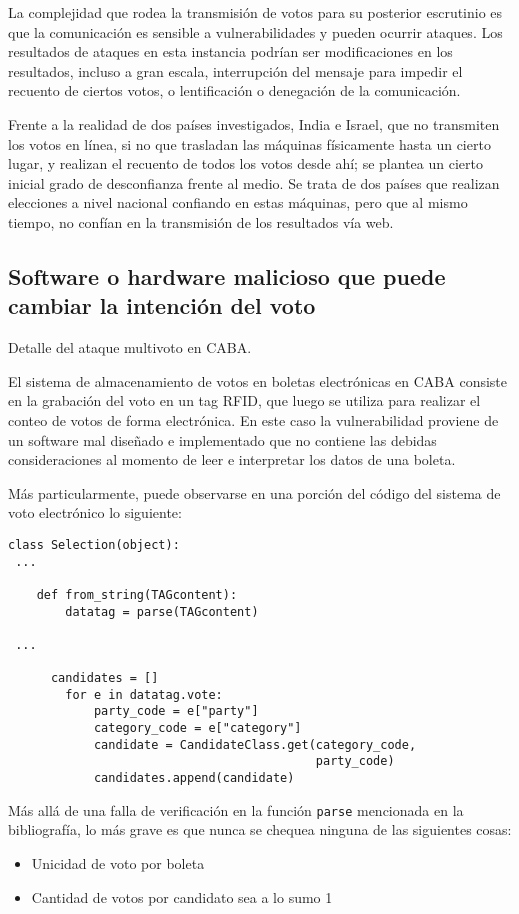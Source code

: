La complejidad que rodea la transmisión de votos para su posterior escrutinio es que la comunicación es sensible a vulnerabilidades y pueden ocurrir ataques. Los resultados de ataques en esta instancia podrían ser modificaciones en los resultados, incluso a gran escala, interrupción del mensaje para impedir el recuento de ciertos votos, o lentificación o denegación de la comunicación.

Frente a la realidad de dos países investigados, India e Israel, que no transmiten los votos en línea, si no que trasladan las máquinas físicamente hasta un cierto lugar, y realizan el recuento de todos los votos desde ahí; se plantea un cierto inicial grado de desconfianza frente al medio. Se trata de dos países que realizan elecciones a nivel nacional confiando en estas máquinas, pero que al mismo tiempo, no confían en la transmisión de los resultados vía web.

\subsection{Software o hardware malicioso que puede cambiar la intención del voto}
Detalle del ataque multivoto en CABA\cite{multivoto}.

El sistema de almacenamiento de votos en boletas electrónicas en CABA consiste en la grabación del voto en un tag RFID, que luego se utiliza para realizar el conteo de votos de forma electrónica. En este caso la vulnerabilidad proviene de un software mal diseñado e implementado que no contiene las debidas consideraciones al momento de leer e interpretar los datos de una boleta.

Más particularmente, puede observarse en una porción del código del sistema de voto electrónico lo siguiente:

\begin{lstlisting}
class Selection(object):
 ...

    def from_string(TAGcontent):
        datatag = parse(TAGcontent)

 ...

      candidates = []
        for e in datatag.vote:
            party_code = e["party"]
            category_code = e["category"]
            candidate = CandidateClass.get(category_code,
                                           party_code)
            candidates.append(candidate)

\end{lstlisting}

Más allá de una falla de verificación en la función \texttt{parse} mencionada en la bibliografía, lo más grave es que nunca se chequea ninguna de las siguientes cosas:
\begin{itemize}
	\item Unicidad de voto por boleta
	\item Cantidad de votos por candidato sea a lo sumo 1
\end{itemize}

